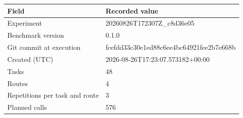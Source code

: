 \begin{tabular}{ll}
\toprule
Field & Recorded value \\
\midrule
Experiment & 20260826T172307Z\_c8d36e05 \\
Benchmark version & 0.1.0 \\
Git commit at execution & fcefdd33c30e1ed88c6ee4bc64921fee2b7e668b \\
Created (UTC) & 2026-08-26T17:23:07.573182+00:00 \\
Tasks & 48 \\
Routes & 4 \\
Repetitions per task and route & 3 \\
Planned calls & 576 \\
\bottomrule
\end{tabular}
